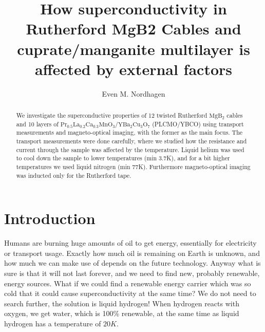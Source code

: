 \documentclass{comjnl}
\newcommand*\chem[1]{\ensuremath{\mathrm{#1}}}
\begin{document}
\title[Superconductivity in Rutherford MgB2 Cables and cuprate/manganite multilayer]{How superconductivity in Rutherford MgB2 Cables and cuprate/manganite multilayer is affected by external factors}
\author{Even M. Nordhagen}
 

 




\begin{abstract}
We investigate the superconductive properties of 12 twisted Rutherford \chem{MgB_2} cables and 10 layers of \chem{Pr_{0.5}La_{0.2}Ca_{0.3}MnO_3/YBa_2Cu_3O_7} (PLCMO/YBCO) using transport measurements and magneto-optical imaging, with the former as the main focus. The transport measurements were done carefully, where we studied how the resistance and current through the sample was affected by the temperature. Liquid helium was used to cool down the sample to lower temperatures (min 3.7K), and for a bit higher temperatures we used liquid nitrogen (min 77K).  Furthermore magneto-optical imaging was inducted only for the Rutherford tape.
\end{abstract}

\maketitle


\section{Introduction}
Humans are burning huge amounts of oil to get energy, essentially for electricity or transport usage. Exactly how much oil is remaining on Earth is unknown, and how much we can make use of depends on the future technology. Anyway what is sure is that it will not last forever, and we need to find new, probably renewable, energy sources. What if we could find a renewable energy carrier which was so cold that it could cause superconductivity at the same time? We do not need to search further, the solution is liquid hydrogen! When hydrogen reacts with oxygen, we get water, which is 100\% renewable, at the same time as liquid hydrogen has a temperature of $20K$.
\end{document}
